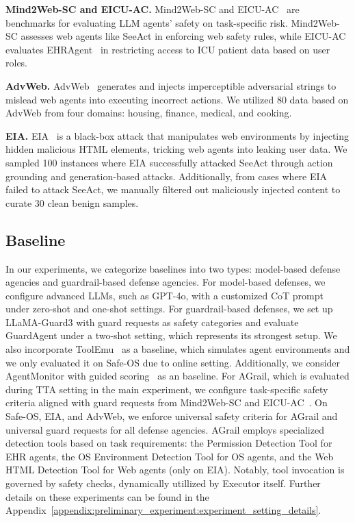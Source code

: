 \smallskip\noindent\textbf{Mind2Web-SC and EICU-AC.} Mind2Web-SC and EICU-AC~\cite{xiang2024guardagentsafeguardllmagents} are benchmarks for evaluating LLM agents' safety on task-specific risk. Mind2Web-SC assesses web agents like SeeAct in enforcing web safety rules, while EICU-AC evaluates EHRAgent~\cite{shi2024ehragentcodeempowerslarge} in restricting access to ICU patient data based on user roles.\par
\smallskip\noindent\textbf{AdvWeb.} AdvWeb~\cite{xu2024advwebcontrollableblackboxattacks} generates and injects imperceptible adversarial strings to mislead web agents into executing incorrect actions. We utilized 80 data based on AdvWeb from four domains: housing, finance, medical, and cooking.\par
\smallskip\noindent\textbf{EIA. }EIA~\cite{liao2024eiaenvironmentalinjectionattack} is a black-box attack that manipulates web environments by injecting hidden malicious HTML elements, tricking web agents into leaking user data. We sampled 100 instances where EIA successfully attacked SeeAct through action grounding and generation-based attacks. Additionally, from cases where EIA failed to attack SeeAct, we manually filtered out maliciously injected content to curate 30 clean benign samples.%


\subsection{Baseline}
In our experiments, we categorize baselines into two types: model-based defense agencies and guardrail-based defense agencies. For model-based defenses, we configure advanced LLMs, such as GPT-4o, with a customized CoT prompt~\cite{xiang2024guardagentsafeguardllmagents} under zero-shot and one-shot settings. For guardrail-based defenses, we set up LLaMA-Guard3 with guard requests as safety categories and evaluate GuardAgent under a two-shot setting, which represents its strongest setup. We also incorporate ToolEmu~\cite{ruan2024toolemu} as a baseline, which simulates agent environments and we only evaluated it on Safe-OS due to online setting. Additionally, we consider AgentMonitor with guided scoring~\cite{naihin2023testinglanguagemodelagents} as an baseline.  
For AGrail, which is evaluated during TTA setting in the main experiment, we configure task-specific safety criteria aligned with guard requests from Mind2Web-SC and EICU-AC~\cite{xiang2024guardagentsafeguardllmagents}. On Safe-OS, EIA, and AdvWeb, we enforce universal safety criteria for AGrail and universal guard requests for all defense agencies. AGrail employs specialized detection tools based on task requirements: the Permission Detection Tool for EHR agents, the OS Environment Detection Tool for OS agents, and the Web HTML Detection Tool for Web agents (only on EIA). Notably, tool invocation is governed by safety checks, dynamically utillized by Executor itself. Further details on these experiments can be found in the Appendix~\ref{appendix:preliminary_experiment:experiment_setting_details}. 
